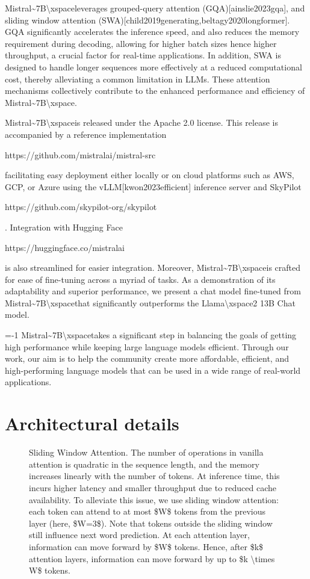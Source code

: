 \documentclass[11pt,a4paper]{article}
\begin{document}
Mistral\textasciitilde{}7B\textbackslash{}xspaceleverages grouped-query attention (GQA)[ainslie2023gqa], and sliding window attention (SWA)[child2019generating,beltagy2020longformer]. GQA significantly accelerates the inference speed, and also reduces the memory requirement during decoding, allowing for higher batch sizes hence higher throughput, a crucial factor for real-time applications. In addition, SWA is designed to handle longer sequences more effectively at a reduced computational cost, thereby alleviating a common limitation in LLMs. These attention mechanisms collectively contribute to the enhanced performance and efficiency of Mistral\textasciitilde{}7B\textbackslash{}xspace.

Mistral\textasciitilde{}7B\textbackslash{}xspaceis released under the Apache 2.0 license. This release is accompanied by a reference implementation

https://github.com/mistralai/mistral-src

facilitating easy deployment either locally or on cloud platforms such as AWS, GCP, or Azure using the vLLM[kwon2023efficient] inference server and SkyPilot

https://github.com/skypilot-org/skypilot

. Integration with Hugging Face

https://huggingface.co/mistralai

is also streamlined for easier integration. Moreover, Mistral\textasciitilde{}7B\textbackslash{}xspaceis crafted for ease of fine-tuning across a myriad of tasks. As a demonstration of its adaptability and superior performance, we present a chat model fine-tuned from Mistral\textasciitilde{}7B\textbackslash{}xspacethat significantly outperforms the Llama\textbackslash{}xspace2 13B  Chat model.

=-1 Mistral\textasciitilde{}7B\textbackslash{}xspacetakes a significant step in balancing the goals of getting high performance while keeping large language models efficient. Through our work, our aim is to help the community create more affordable, efficient, and high-performing language models that can be used in a wide range of real-world applications.

\section{Architectural details}

\begin{figure}[h]
\caption{Sliding Window Attention. The number of operations in vanilla attention is quadratic in the sequence length, and the memory increases linearly with the number of tokens. At inference time, this incurs higher latency and smaller throughput due to reduced cache availability. To alleviate this issue, we use sliding window attention: each token can attend to at most \$W\$ tokens from the previous layer (here, \$W=3\$). Note that tokens outside the sliding window still influence next word prediction. At each attention layer, information can move forward by \$W\$ tokens. Hence, after \$k\$ attention layers, information can move forward by up to \$k \textbackslash{}times W\$ tokens.}
\end{figure}
\end{document}
